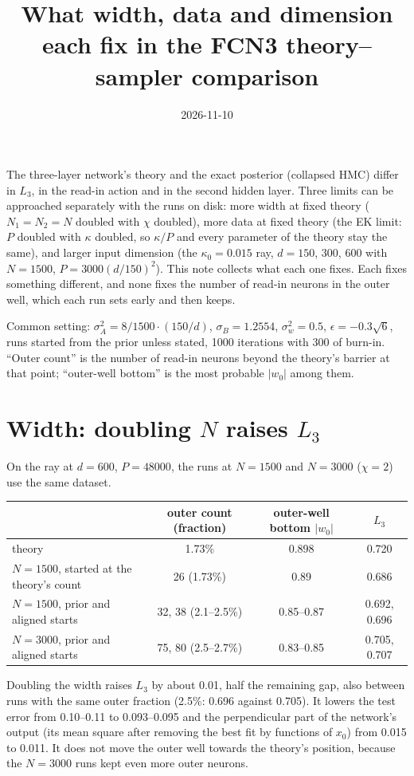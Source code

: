 \documentclass[11pt,a4paper]{article}
\title{What width, data and dimension each fix in the FCN3 theory--sampler comparison}
\author{}
\date{2026-11-10}
\begin{document}
\sloppy
\maketitle

The three-layer network's theory and the exact posterior (collapsed HMC) differ in $L_3$, in the read-in action and in
the second hidden layer. Three limits can be approached separately with the runs on disk: more width at fixed theory
($N_1=N_2=N$ doubled with $\chi$ doubled), more data at fixed theory (the EK limit: $P$ doubled with $\kappa$ doubled, so
$\kappa/P$ and every parameter of the theory stay the same), and larger input dimension (the $\kappa_0=0.015$ ray, $d=150$,
300, 600 with $N=1500$, $P=3000(d/150)^2$). This note collects what each one fixes. Each fixes something different, and
none fixes the number of read-in neurons in the outer well, which each run sets early and then keeps.

Common setting: $\sigma_A^2=8/1500\cdot(150/d)$, $\sigma_B=1.2554$, $\sigma_w^2=0.5$, $\epsilon=-0.3\sqrt6$, runs started from the
prior unless stated, 1000 iterations with 300 of burn-in. ``Outer count'' is the number of read-in neurons beyond the
theory's barrier at that point; ``outer-well bottom'' is the most probable $|w_0|$ among them.

\section*{Width: doubling $N$ raises $L_3$}

On the ray at $d=600$, $P=48000$, the runs at $N=1500$ and $N=3000$ ($\chi=2$) use the same dataset.
\begin{center}\small
\begin{tabular}{@{}lccc@{}}
\toprule
& outer count (fraction) & outer-well bottom $|w_0|$ & $L_3$\\
\midrule
theory & 1.73\% & 0.898 & 0.720\\
$N=1500$, started at the theory's count & 26 (1.73\%) & 0.89 & 0.686\\
$N=1500$, prior and aligned starts & 32, 38 (2.1--2.5\%) & 0.85--0.87 & 0.692, 0.696\\
$N=3000$, prior and aligned starts & 75, 80 (2.5--2.7\%) & 0.83--0.85 & 0.705, 0.707\\
\bottomrule
\end{tabular}
\end{center}
Doubling the width raises $L_3$ by about 0.01, half the remaining gap, also between runs with the same outer fraction
(2.5\%: 0.696 against 0.705). It lowers the test error from 0.10--0.11 to 0.093--0.095 and the perpendicular part of
the network's output (its mean square after removing the best fit by functions of $x_0$) from 0.015 to 0.011. It
does not move the outer well towards the theory's position, because the $N=3000$ runs kept even more outer neurons.
\end{document}
